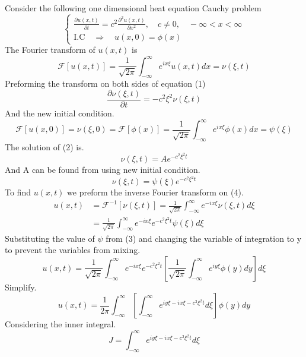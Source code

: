 \documentclass[]{article}
\begin{document}
Consider the following one dimensional heat equation Cauchy problem
\begin{equation}
    \begin{cases}
        \displaystyle \frac{\partial u(x,t)}{\partial t} = c^2\frac{\partial^2 u(x,t)}{\partial x^2}, \quad c \neq 0 , \quad -\infty < x< \infty
        \\
        \text{I.C} \quad \Longrightarrow \quad u(x,0) = \phi(x)
    \end{cases}
\end{equation}
The Fourier transform of $u(x,t)$ is
\[
    \mathscr{F}[u(x,t)] = \frac{1}{\sqrt{2\pi}}\int_{-\infty}^{\infty}e^{ix\xi}u\left(x,t\right)dx= \nu\left(\xi,t\right)    
\]
Preforming the transform on both sides of equation (1)
\begin{equation}
\frac{\partial\nu(\xi,t)}{\partial t} = -c^2 \xi^2 \nu(\xi,t)
\end{equation}
And the new initial condition.
\begin{equation}
\mathscr{F}[u(x,0)] = \nu(\xi,0) =\mathscr{F}[\phi(x)] = \frac{1}{\sqrt{2\pi}}\int_{-\infty}^{\infty}e^{ix\xi}\phi\left(x\right)dx = \psi(\xi)
\end{equation}
The solution of (2) is.
\[
    \nu(\xi,t) = Ae^{-c^2 \xi^2 t}    
\]
And A can be found from using new initial condition. 
\begin{equation}
\nu(\xi,t)= \psi(\xi)e^{-c^2 \xi^2 t}
\end{equation}
To find $u(x,t)$ we preform the inverse Fourier transform on (4).
\begin{align*}
u(x,t) &= \mathscr{F}^{-1}[\nu(\xi,t)] = \frac{1}{\sqrt{2\pi}}\int_{-\infty}^{\infty}e^{-ix\xi}\nu(\xi,t)d\xi
\\
&= \frac{1}{\sqrt{2\pi}}\int_{-\infty}^{\infty}e^{-ix\xi}e^{-c^2 \xi^2 t}\psi(\xi)d\xi
\end{align*}
Substituting the value of $\psi$ from (3) and changing the variable of integration to y to prevent the variables from mixing.
\[
    u(x,t) = \frac{1}{\sqrt{2\pi}}\int_{-\infty}^{\infty}e^{-ix\xi}e^{-c^2 \xi^2 t}\left[\frac{1}{\sqrt{2\pi}}\int_{-\infty}^{\infty}e^{iy\xi}\phi\left(y\right)dy\right]d\xi    
\]
Simplify.
\begin{equation}
u(x,t) = \frac{1}{2\pi}\int_{-\infty}^{\infty}\left[\int_{-\infty}^{\infty}e^{iy\xi -ix\xi - c^2 \xi^2 t} d\xi \right] \phi(y)dy
\end{equation}
Considering the inner integral.
\begin{equation}
J = \int_{-\infty}^{\infty}e^{iy\xi -ix\xi - c^2 \xi^2 t} d\xi
\end{equation}
\end{document}
